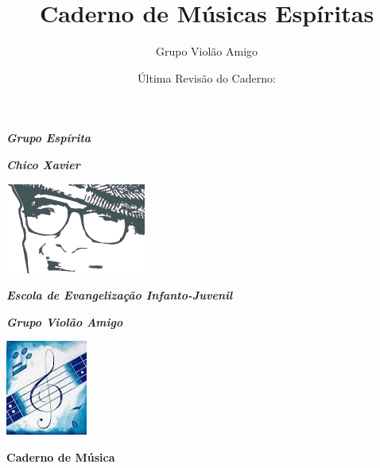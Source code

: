 \documentclass[a4,12pt,oneside]{book}
\title{Caderno de Músicas Espíritas}
\author{Grupo Violão Amigo}
\date{Última Revisão do Caderno: \RelDate}
\begin{document}

\newpage
\thispagestyle{empty}
\begin{titlepage}

	\begin{center}
	
	
		\LARGE{\textbf{\textit{Grupo Espírita}}}
		
		\LARGE{\textbf{\textit{Chico Xavier}}}
		
		\vspace{2cm}
	
		\includegraphics[scale=1.2]{chico.jpg}
		
		\vspace{2cm}
	
		\Large{\textbf{\textit{Escola de Evangelização Infanto-Juvenil}}}
	
		\Large{\textbf{\textit{Grupo Violão Amigo}}}
		
		\vspace{2cm}
		\includegraphics[scale=1.5]{nota.jpg}
		
		\vspace{3cm}
		
		\Large{\textbf{Caderno de Música}}
		\end{center}
\end{titlepage}
\end{document}
